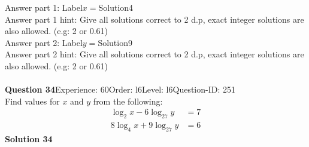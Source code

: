 \documentclass{article}
\begin{document}
Answer part 1: \hspace{10pt}Label\hspace{10pt}$x=$\hspace{10pt}Solution\hspace{10pt}4\\
Answer part 1 hint: \hspace{15pt}Give all solutions correct to 2 d.p, exact integer solutions are also allowed. (e.g: 2 or 0.61)\\
Answer part 2: \hspace{10pt}Label\hspace{10pt}$y=$\hspace{10pt}Solution\hspace{10pt}9\\
Answer part 2 hint: \hspace{15pt}Give all solutions correct to 2 d.p, exact integer solutions are also allowed. (e.g: 2 or 0.61)\\
\\[4pt]
\noindent\textbf{Question 34}\hspace{20pt}Experience: 60\hspace{20pt}Order: l6\hspace{20pt}Level: l6\hspace{20pt}Question-ID: 251\\[2pt]
Find values for $x$ and $y$ from the following:
\begin{align*}
\log_{2}x-6\log_{27}y&=7\\[2pt]
8\log_{4}x+9\log_{27}y&=6
\end{align*}
\noindent\textbf{Solution 34}\\[2pt]
\end{document}
